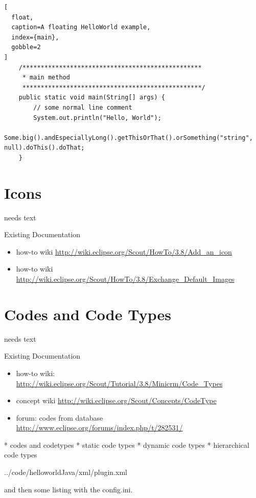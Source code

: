 \documentclass[a4paper,10pt,twoside]{book}
\begin{document}
\begin{lstlisting}[
  float,
  caption=A floating HelloWorld example,
  index={main},
  gobble=2
]
    /*************************************************
     * main method
     *************************************************/
    public static void main(String[] args) {
        // some normal line comment
        System.out.println("Hello, World");
        Some.big().andEspeciallyLong().getThisOrThat().orSomething("string", null).doThis().doThat;
    }
\end{lstlisting}

\section{Icons}
needs text

\noindent Existing Documentation
\begin{itemize}
  \item how-to wiki \url{http://wiki.eclipse.org/Scout/HowTo/3.8/Add_an_icon}
  \item how-to wiki \url{http://wiki.eclipse.org/Scout/HowTo/3.8/Exchange_Default_Images}
\end{itemize}

\section{Codes and Code Types}
needs text

\noindent Existing Documentation
\begin{itemize}
  \item how-to wiki: \url{http://wiki.eclipse.org/Scout/Tutorial/3.8/Minicrm/Code_Types}
  \item concept wiki \url{http://wiki.eclipse.org/Scout/Concepts/CodeType}
  \item forum: codes from database \url{http://www.eclipse.org/forums/index.php/t/282531/}
\end{itemize}

  * codes and codetypes
  * static code types
  * dynamic code types
  * hierarchical code types

  
  

{../code/helloworldJava/xml/plugin.xml}

and then some listing with the config.ini.
\end{document}
